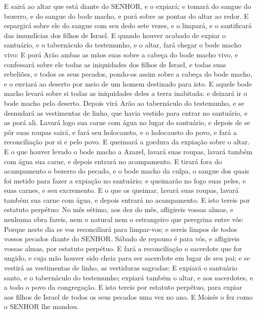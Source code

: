 {E sairá ao altar que está diante do SENHOR, e o expiará; e tomará do sangue do bezerro, e do sangue do bode macho, e porá sobre as pontas do altar ao redor.
E espargirá sobre ele do sangue com seu dedo sete vezes, e o limpará, e o santificará das imundícias dos filhos de Israel.
E quando houver acabado de expiar o santuário, e o tabernáculo do testemunho, e o altar, fará chegar o bode macho vivo:
E porá Arão ambas as mãos suas sobre a cabeça do bode macho vivo, e confessará sobre ele todas as iniquidades dos filhos de Israel, e todas suas rebeliões, e todos os seus pecados, pondo-os assim sobre a cabeça do bode macho, e o enviará ao deserto por meio de um homem destinado para isto.
E aquele bode macho levará sobre si todas as iniquidades deles a terra inabitada: e deixará ir o bode macho pelo deserto.
Depois virá Arão ao tabernáculo do testemunho, e se desnudará as vestimentas de linho, que havia vestido para entrar no santuário, e as porá ali.
Lavará logo sua carne com água no lugar do santuário, e depois de se pôr suas roupas sairá, e fará seu holocausto, e o holocausto do povo, e fará a reconciliação por si e pelo povo.
E queimará a gordura da expiação sobre o altar.
E o que houver levado o bode macho a Azazel, lavará suas roupas, lavará também com água sua carne, e depois entrará no acampamento.
E tirará fora do acampamento o bezerro do pecado, e o bode macho da culpa, o sangue dos quais foi metido para fazer a expiação no santuário; e queimarão no fogo suas peles, e suas carnes, e seu excremento.
E o que os queimar, lavará suas roupas, lavará também sua carne com água, e depois entrará no acampamento.
E isto tereis por estatuto perpétuo: No mês sétimo, aos dez do mês, afligireis vossas almas, e nenhuma obra fareis, nem o natural nem o estrangeiro que peregrina entre vós:
Porque neste dia se vos reconciliará para limpar-vos; e sereis limpos de todos vossos pecados diante do SENHOR.
Sábado de repouso é para vós, e afligireis vossas almas, por estatuto perpétuo.
E fará a reconciliação o sacerdote que for ungido, e cuja mão houver sido cheia para ser sacerdote em lugar de seu pai; e se vestirá as vestimentas de linho, as vestiduras sagradas:
E expiará o santuário santo, e o tabernáculo do testemunho; expiará também o altar, e aos sacerdotes, e a todo o povo da congregação.
E isto tereis por estatuto perpétuo, para expiar aos filhos de Israel de todos os seus pecados uma vez no ano. E Moisés o fez como o SENHOR lhe mandou.

}
